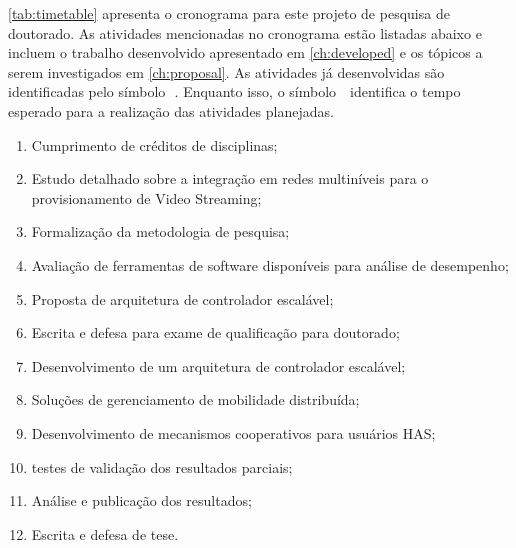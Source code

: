 \autoref{tab:timetable} apresenta o cronograma para este projeto de pesquisa de doutorado. As atividades mencionadas no cronograma estão listadas abaixo e incluem o trabalho desenvolvido apresentado em \autoref{ch:developed} e os tópicos a serem investigados em \autoref{ch:proposal}. As atividades já desenvolvidas são identificadas pelo símbolo~\,\m. Enquanto isso, o símbolo \,\x\ identifica o tempo esperado para a realização das atividades planejadas.


\begin{enumerate}
 	\itemsep0pt
	\item Cumprimento de créditos de disciplinas;
    \item Estudo detalhado sobre a integração em redes multiníveis para o provisionamento de Video Streaming;
    \item Formalização da metodologia de pesquisa;
    \item Avaliação de ferramentas de software disponíveis para análise de desempenho;
    \item Proposta de arquitetura de controlador escalável;
    \item Escrita e defesa para exame de qualificação para doutorado;
    \item Desenvolvimento de um arquitetura de controlador escalável;
    \item Soluções de gerenciamento de mobilidade distribuída;
    \item Desenvolvimento de mecanismos cooperativos para usuários HAS;
    \item testes de validação dos resultados parciais;
    \item Análise e publicação dos resultados;
    \item Escrita e defesa de tese.
\end{enumerate}

